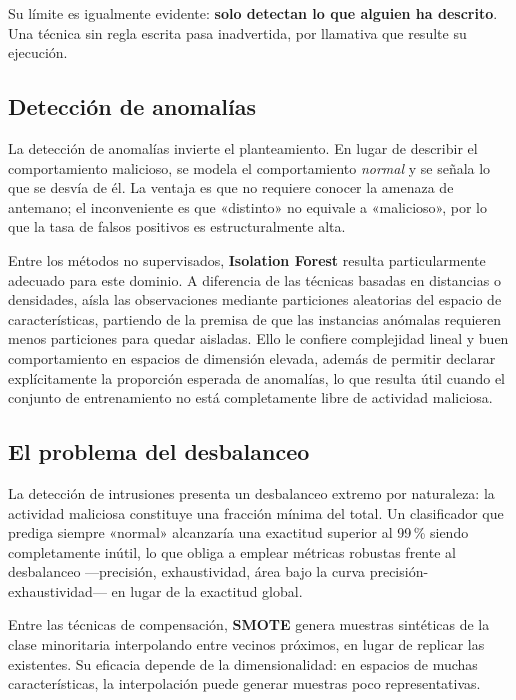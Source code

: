 Su límite es igualmente evidente: \textbf{solo detectan lo que alguien ha descrito}. Una
técnica sin regla escrita pasa inadvertida, por llamativa que resulte su ejecución.

\subsection{Detección de anomalías}

La detección de anomalías invierte el planteamiento. En lugar de describir el comportamiento
malicioso, se modela el comportamiento \textit{normal} y se señala lo que se desvía de él.
La ventaja es que no requiere conocer la amenaza de antemano; el inconveniente es que
«distinto» no equivale a «malicioso», por lo que la tasa de falsos positivos es
estructuralmente alta.

Entre los métodos no supervisados, \textbf{Isolation Forest} \cite{isolationforest} resulta
particularmente adecuado para este dominio. A diferencia de las técnicas basadas en
distancias o densidades, aísla las observaciones mediante particiones aleatorias del espacio
de características, partiendo de la premisa de que las instancias anómalas requieren menos
particiones para quedar aisladas. Ello le confiere complejidad lineal y buen comportamiento
en espacios de dimensión elevada, además de permitir declarar explícitamente la proporción
esperada de anomalías, lo que resulta útil cuando el conjunto de entrenamiento no está
completamente libre de actividad maliciosa.

\subsection{El problema del desbalanceo}

La detección de intrusiones presenta un desbalanceo extremo por naturaleza: la actividad
maliciosa constituye una fracción mínima del total. Un clasificador que prediga siempre
«normal» alcanzaría una exactitud superior al 99\,\% siendo completamente inútil, lo que
obliga a emplear métricas robustas frente al desbalanceo —precisión, exhaustividad, área
bajo la curva precisión-exhaustividad— en lugar de la exactitud global.

Entre las técnicas de compensación, \textbf{SMOTE} \cite{smote} genera muestras sintéticas
de la clase minoritaria interpolando entre vecinos próximos, en lugar de replicar las
existentes. Su eficacia depende de la dimensionalidad: en espacios de muchas
características, la interpolación puede generar muestras poco representativas.

